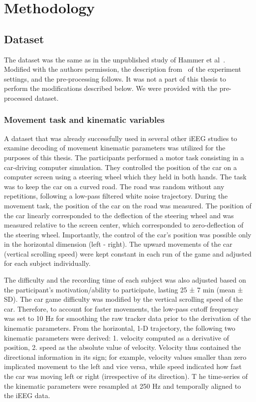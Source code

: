 \chapter{Methodology}

\section{Dataset}
The dataset was the same as in the unpublished study of Hammer et al~\cite{}.
Modified with the authors permission, the description from~\cite{Hammer_2021} of the experiment settings,
and the pre-processing follows.
It was not a part of this thesis to perform the modifications described below.
We were provided with the pre-processed dataset.

\subsection{Movement task and kinematic variables}\label{subsec:movement-task-and-kinematic-variables}
A dataset that was already successfully used in several other iEEG studies to examine decoding of movement kinematic parameters \cite{Hammer_2021, 2016, 2013} was utilized for the purposes of this thesis.
The participants performed a motor task consisting in a car-driving computer simulation.
They controlled the position of the car on a computer screen using a steering wheel which they held in both hands.
The task was to keep the car on a curved road.
The road was random without any repetitions, following a low-pass filtered white noise trajectory.
During the movement task, the position of the car on the road was measured.
The position of the car linearly corresponded to the deflection of the steering wheel and was measured relative to the screen center, which corresponded to zero-deflection of the steering wheel.
Importantly, the control of the car's position was possible only in the horizontal dimension (left - right).
The upward movements of the car (vertical scrolling speed) were kept constant in each run of the game and adjusted for each subject individually.

The difficulty and the recording time of each subject was also adjusted based on the participant's motivation/ability to participate, lasting 25 ± 7 min (mean ± SD).
The car game difficulty was modified by the vertical scrolling speed of the car.
Therefore, to account for faster movements, the low-pass cutoff frequency was set to 10 Hz for smoothing the raw tracker data prior to the derivation of the kinematic parameters.
From the horizontal, 1-D trajectory, the following two kinematic parameters were derived:
1. velocity computed as a derivative of position, 2. speed as the absolute value of velocity.
Velocity thus contained the directional information in its sign;
for example, velocity values smaller than zero implicated movement to the left and vice versa, while speed indicated how fast the car was moving left or right (irrespective of its direction). T
he time-series of the kinematic parameters were resampled at 250 Hz and temporally aligned to the iEEG data.

